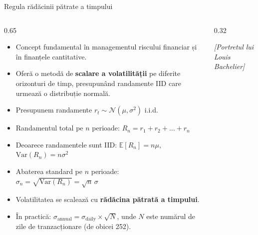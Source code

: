 \documentclass[9pt, aspectratio=169, t]{beamer}
\theoremstyle{definition}
\newcommand{\E}{\mathbb{E}}
\newcommand{\Var}{\text{Var}}
\begin{document}
\begin{frame}{Regula rădăcinii pătrate a timpului}
\begin{columns}[T]
\begin{column}{0.65\textwidth}
\begin{itemize}
    \item Concept fundamental în managementul riscului financiar și în finanțele cantitative.
    \item Oferă o metodă de \textbf{scalare a volatilității} pe diferite orizonturi de timp, presupunând randamente IID care urmează o distribuție normală.
    \item Presupunem randamente $r_t \sim \mathcal{N}(\mu, \sigma^2)$ i.i.d.
    \item Randamentul total pe $n$ perioade: $R_n = r_1 + r_2 + \ldots + r_n$
    \item Deoarece randamentele sunt IID:
    $\E[R_n] = n\mu$, \  $\Var(R_n) = n\sigma^2$
    \item Abaterea standard pe $n$ perioade:
    $\sigma_n = \sqrt{\Var(R_n)} = \sqrt{n}\,\sigma$
    \item Volatilitatea se scalează cu \textbf{rădăcina pătrată a timpului}.
    \item În practică: $\sigma_{\text{annual}} = \sigma_{\text{daily}} \times \sqrt{N}$, unde $N$ este numărul de zile de tranzacționare (de obicei 252).
\end{itemize}
\end{column}
\begin{column}{0.32\textwidth}
\begin{center}
    {\small\textit{[Portretul lui Louis Bachelier]}}
\end{center}
\end{column}
\end{columns}
\end{frame}
\end{document}
